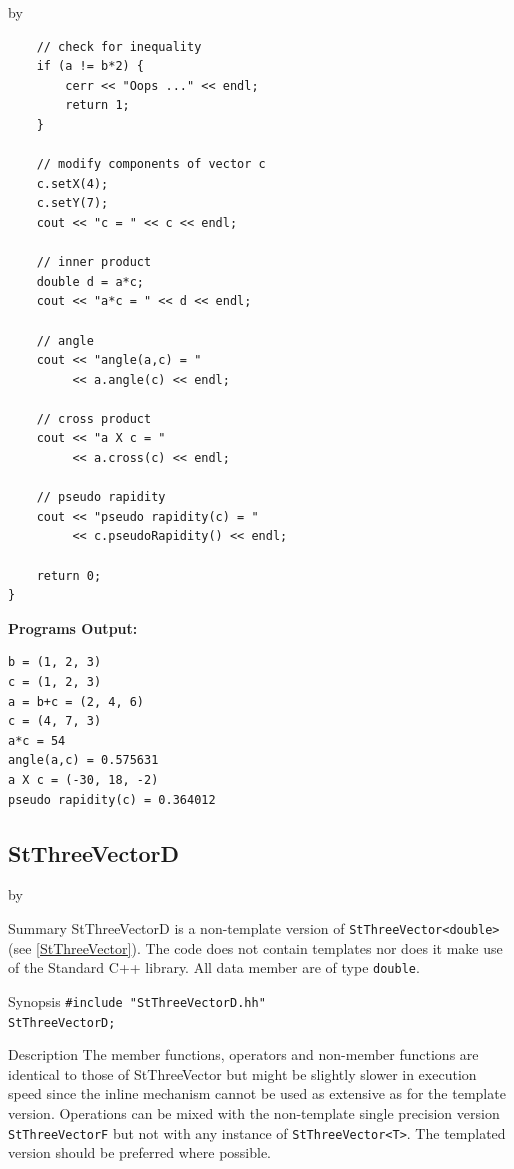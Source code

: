 \documentclass[twoside]{article}
\newcommand{\entrylabel}[1]{\mbox{\textbf{{#1}}}\hfil}%
\newenvironment{entry}
{\begin{list}{}%
    {\renewcommand{\makelabel}{\entrylabel}%
     \setlength{\labelwidth}{90pt}%
     \setlength{\leftmargin}{\labelwidth}
     \advance\leftmargin by \labelsep%
      }%
    }%
  {\end{list}}
\newcommand{\Entrylabel}[1]%
{\raisebox{0pt}[1ex][0pt]{\makebox[\labelwidth][l]%
    {\parbox[t]{\labelwidth}{\hspace{0pt}\textbf{{#1}}}}}}
\newenvironment{Entry}%
{\renewcommand{\entrylabel}{\Entrylabel}\begin{entry}}%
  {\end{entry}}
\begin{document}
\begin{description}
\begin{Entry}
{\begin{verbatim}
    // check for inequality
    if (a != b*2) {
        cerr << "Oops ..." << endl;
        return 1;
    }

    // modify components of vector c
    c.setX(4);
    c.setY(7);
    cout << "c = " << c << endl;

    // inner product
    double d = a*c;
    cout << "a*c = " << d << endl;

    // angle
    cout << "angle(a,c) = "
         << a.angle(c) << endl;

    // cross product
    cout << "a X c = "
         << a.cross(c) << endl;
    
    // pseudo rapidity
    cout << "pseudo rapidity(c) = "
         << c.pseudoRapidity() << endl;
    
    return 0;
}
\end{verbatim}

{\bf Programs Output:}

\begin{verbatim}
b = (1, 2, 3)
c = (1, 2, 3)
a = b+c = (2, 4, 6)
c = (4, 7, 3)
a*c = 54
angle(a,c) = 0.575631
a X c = (-30, 18, -2)
pseudo rapidity(c) = 0.364012
\end{verbatim}
}
\end{Entry}

\clearpage

%
%
\subsection{StThreeVectorD }
\begin{Entry}
\item[Summary]
    StThreeVectorD is a non-template version of \verb+StThreeVector<double>+
    (see \ref{StThreeVector}). The code does not contain templates nor
    does it make use of the Standard C++ library. All data member are of
    type \texttt{double}.
    
\item[Synopsis]
    \verb+#include "StThreeVectorD.hh"+ \\
    \verb+StThreeVectorD;+
    
    
\item[Description]       
    The member functions, operators and non-member functions are identical
    to those of StThreeVector but might be slightly slower in execution speed
    since the inline mechanism cannot be used as extensive as for the template
    version. Operations can be mixed with the non-template single precision version
    \texttt{StThreeVectorF} but not with any instance of \verb+StThreeVector<T>+.
    The templated version should be preferred where possible.
    

\end{Entry}
\end{description}
\end{document}

